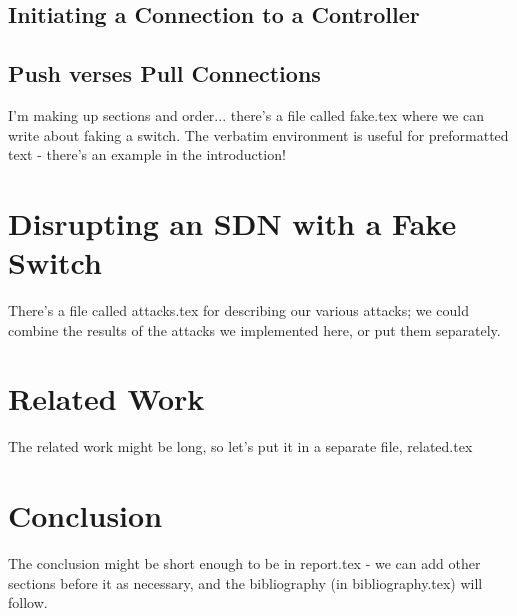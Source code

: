 \documentclass[12pt, letterpaper, twoside]{article}
\begin{document}
\begin{spacing}{1.0}
\begin{multicols}{2}
\subsection{Initiating a Connection to a Controller}

\subsection{Push verses Pull Connections}

\label{fake}
I'm making up sections and order... there's a file called fake.tex where we can write about faking a switch. The verbatim environment is useful for preformatted text - there's an example in the introduction!


\section{Disrupting an SDN with a Fake Switch}
\label{attacks}
There's a file called attacks.tex for describing our various attacks; we could combine the results of the attacks we implemented here, or put them separately.


\section{Related Work}
\label{related}
The related work might be long, so let's put it in a separate file, related.tex


\section{Conclusion}
The conclusion might be short enough to be in report.tex - we can add other sections before it as necessary, and the bibliography (in bibliography.tex) will follow.




\end{multicols}

\end{spacing}
\end{document}
